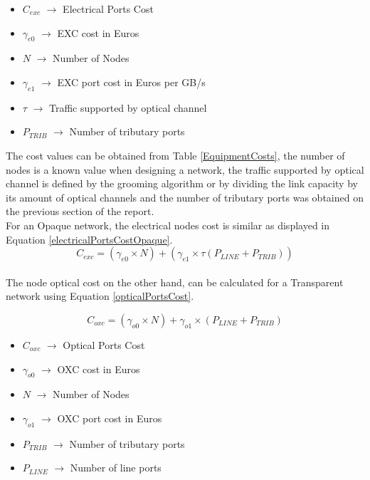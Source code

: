 	\begin{itemize}
		\item{$C_{exc}$		$\rightarrow$	Electrical Ports Cost}
		\item{$\gamma_{e0}$	$\rightarrow$	EXC cost in Euros}
		\item{$N$			$\rightarrow$	Number of Nodes}
		\item{$\gamma_{e1}$	$\rightarrow$	EXC port cost in Euros per GB/s}
		\item{$\tau$		$\rightarrow$	Traffic supported by optical channel}
		\item{$P_{TRIB}$		$\rightarrow$	Number of tributary ports}
	\end{itemize}
	
	The cost values can be obtained from Table \ref{EquipmentCosts}, the number of nodes is a known value when designing a network, the traffic supported by optical channel is defined by the grooming algorithm or by dividing the link capacity by its amount of optical channels and the number of tributary ports was obtained on the previous section of the report. \\
	
	For an Opaque network, the electrical nodes cost is similar as displayed in Equation \ref{electricalPortsCostOpaque}.\\
	
	\begin{equation}
	C_{exc} = \left(\gamma_{e0}\times N\right) + \left(\gamma_{e1} \times \tau \left(P_{LINE} + P_{TRIB}\right)\right)
	\label{electricalPortsCostOpaque}
	\end{equation}	\\
	
	The node optical cost on the other hand, can be calculated for a Transparent network using Equation \ref{opticalPortsCost}.
	
	\begin{equation}
		C_{oxc} = \left(\gamma_{o0} \times N \right) + \gamma_{o1} \times  \left(P_{LINE} + P_{TRIB}\right)
		\label{opticalPortsCost}
	\end{equation}	
	
	\begin{itemize}
		\item{$C_{oxc}$		$\rightarrow$	Optical Ports Cost}
		\item{$\gamma_{o0}$	$\rightarrow$	OXC cost in Euros}
		\item{$N$			$\rightarrow$	Number of Nodes}
		\item{$\gamma_{o1}$	$\rightarrow$	OXC port cost in Euros}
		\item{$P_{TRIB}	$	$\rightarrow$	Number of tributary ports}
		\item{$P_{LINE} $	$\rightarrow$	Number of line ports}
	\end{itemize}
		
